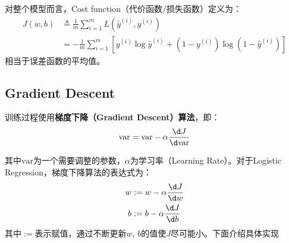 对整个模型而言，Cost function（代价函数/损失函数）定义为：
\begin{equation}
    \begin{aligned}
        J(w, b) &\triangleq  \frac{1}{m} \sum_{i=1}^{m} L(\hat{y}^{(i)}, y^{(i)}) \\
        &= -\frac{1}{m} \sum_{i=1}^{m} \left[y^{(i)} \log \hat{y}^{(i)} + (1 - y^{(i)}) \log (1 - \hat{y}^{(i)})\right] \label{eq:cost}
    \end{aligned}
\end{equation}
相当于误差函数的平均值。

\subsection{Gradient Descent}

训练过程使用\textbf{梯度下降（Gradient Descent）算法}，即：
\begin{equation}
    \mathrm{var} = \mathrm{var} - \alpha \frac{\d J}{\d \mathrm{var}} \label{eq:gradient}
\end{equation}

其中$\mathrm{var}$为一个需要调整的参数，$\alpha$为学习率（Learning Rate）。对于Logistic Regression，梯度下降算法的表达式为：
\begin{equation}
    \begin{aligned}
    w &:= w - \alpha \frac{\d J}{\d w} \\
    b &:= b - \alpha \frac{\d J}{\d b}
    \end{aligned} 
    \label{eq:gradient_logistic}
\end{equation}
其中$:=$表示赋值，通过不断更新$w$, $b$的值使$J$尽可能小。下面介绍具体实现

